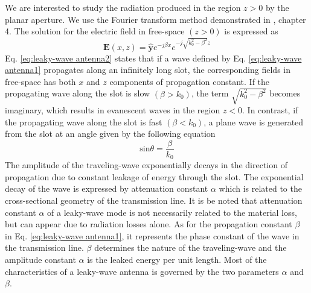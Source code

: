 We are interested to study the radiation produced in the region $z>0$ by the planar aperture. We use the Fourier transform method demonstrated in \cite{Collin1985}, chapter 4. The solution for the electric field in free-space $(z>0)$ is expressed as
%
\begin{equation} \label{eq:leaky-wave antenna2}
    \mathbf{E}(x,z) = \hat{\mathbf{y}}e^{ - j \beta x}e^{ - j \sqrt{k_0^2 - \beta^2} z}
\end{equation}
%
Eq. \ref{eq:leaky-wave antenna2} states that if a wave defined by Eq. \ref{eq:leaky-wave antenna1} propagates along an infinitely long slot, the corresponding fields in free-space has both $x$ and $z$ components of propagation constant. If the propagating wave along the slot is slow $(\beta > k_0)$, the term $\sqrt{k_0^2 - \beta^2}$ becomes imaginary, which results in evanescent waves in the region $z<0$. In contrast, if the propagating wave along the slot is fast $(\beta < k_0)$, a plane wave is generated from the slot at an angle given by the following equation
\begin{equation} \label{eq:ktheta}
     \mathrm{sin}\theta = \dfrac{\beta}{k_0}
\end{equation}
The amplitude of the traveling-wave exponentially decays in the direction of propagation due to constant leakage of energy through the slot. The exponential decay of the wave is expressed by attenuation constant $\alpha$ which is related to the cross-sectional geometry of the transmission line. It is be noted that attenuation constant $\alpha$ of a leaky-wave mode is not necessarily related to the material loss, but can appear due to radiation losses alone. As for the propagation constant $\beta$ in Eq. \ref{eq:leaky-wave antenna1}, it represents the phase constant of the wave in the transmission line. $\beta$ determines the nature of the traveling-wave and the amplitude constant $\alpha$ is the leaked energy per unit length. Most of the characteristics of a leaky-wave antenna is governed by the two parameters $\alpha$ and $\beta$.

